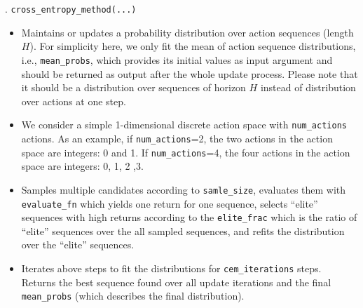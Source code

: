 \documentclass{article}
\begin{document}
. \texttt{cross\_entropy\_method(...)}
\begin{itemize}
    \item Maintains or updates a probability distribution over action sequences (length $H$). For simplicity here, we only fit the mean of action sequence distributions, i.e., \texttt{mean\_probs}, which provides its initial values as input argument and should be returned as output after the whole update process. Please note that it should be a distribution over sequences of horizon $H$ instead of distribution over actions at one step.
    \item We consider a simple 1-dimensional discrete action space with \texttt{num\_actions} actions. As an example, if \texttt{num\_actions}=2, the two actions in the action space are integers: 0 and 1. If \texttt{num\_actions}=4, the four actions in the action space are integers: 0, 1, 2 ,3. 
    \item Samples multiple candidates according to \texttt{samle\_size}, evaluates them with \texttt{evaluate\_fn} which yields one return for one sequence, selects ``elite'' sequences with high returns according to the \texttt{elite\_frac} which is the ratio of ``elite'' sequences over the all sampled sequences, and refits the distribution over the ``elite'' sequences.
    \item Iterates above steps to fit the distributions for \texttt{cem\_iterations} steps. Returns the best sequence found over all update iterations and the final \texttt{mean\_probs} (which describes the final distribution).    
\end{itemize}
\end{document}
